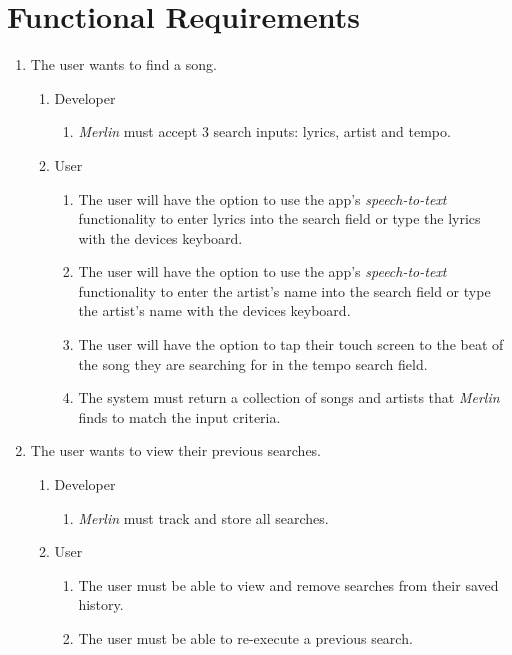 \documentclass[]{article}
\newcommand{\merlin}{\textit{Merlin }}
\begin{document}
\section{Functional Requirements}
\label{sec:functional_requirements}
\cbstart
\begin{enumerate}[{BE}1.]
	\item The user wants to find a song.
	\begin{enumerate}[{VP1}.1]
		\item Developer
			\begin{enumerate}
				\item \merlin must accept 3 search inputs: lyrics, artist and tempo.
			\end{enumerate}
		\item User
			\begin{enumerate}
				\item The user will have the option to use the app's \textit{speech-to-text} functionality to enter lyrics into the search field or type the lyrics with the devices keyboard.
				\item The user will have the option to use the app's \textit{speech-to-text} functionality to enter the artist's name into the search field or type the artist's name with the devices keyboard.
				\item The user will have the option to tap their touch screen to the beat of the song they are searching for in the tempo search field.
				\item The system must return a collection of songs and artists that \merlin finds to match the input criteria.
			\end{enumerate}
	\end{enumerate}
	\item The user wants to view their previous searches.
	\begin{enumerate}[{VP2}.1]
		\item Developer
			\begin{enumerate}
				\item \merlin must track and store all searches.
			\end{enumerate}
		\item User
			\begin{enumerate}
				\item The user must be able to view and remove searches from their saved history.
				\item The user must be able to re-execute a previous search.
			\end{enumerate}

\end{enumerate}
\end{enumerate}
\end{document}
